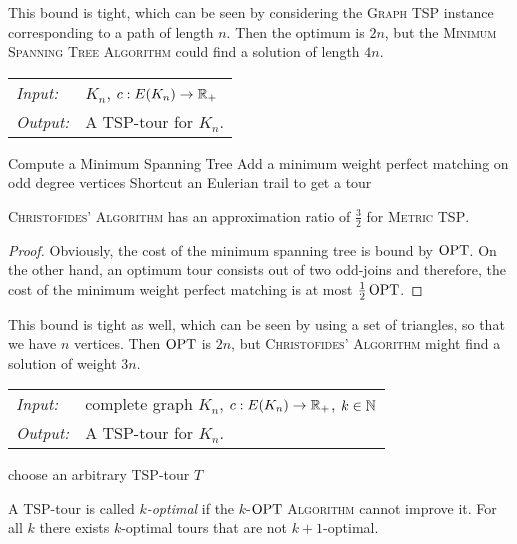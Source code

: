 \documentclass[../skript.tex]{subfiles}
\begin{document}
This bound is tight, which can be seen by considering the \textsc{Graph TSP} instance corresponding to a path of length $n$. Then the optimum is $2n$, but the \textsc{Minimum Spanning Tree Algorithm} could find a solution of length $4n$.
\begin{samepage}
\begin{algorithmbox}
\begin{tabular}{@{}ll}
\textit{Input:} & $K_n$, $c : E(K_n) \to \mathbb{R}_+$\\
\textit{Output:} & A TSP-tour for $K_n$.
\end{tabular}
\end{algorithmbox}
\vspace{-7pt}
\begin{algorithm}[H]
Compute a Minimum Spanning Tree\;
Add a minimum weight perfect matching on odd degree vertices\;
Shortcut an Eulerian trail to get a tour\;
\end{algorithm}
\vspace{-7pt}
\EndAlgorithmLine
\end{samepage}
\begin{theorem} %
\label{thm:88}
\textsc{Christofides' Algorithm} has an approximation ratio of $\frac{3}{2}$ for \textsc{Metric TSP}.
\end{theorem}
\begin{proof}
Obviously, the cost of the minimum spanning tree is bound by $\operatorname{OPT}$. On the other hand, an optimum tour consists out of two odd-joins and therefore, the cost of the minimum weight perfect matching is at most $\frac{1}{2} \operatorname{OPT}$.
\end{proof}
This bound is tight as well, which can be seen by using a set of triangles, so that we have $n$ vertices. Then $\operatorname{OPT}$ is $2n$, but \textsc{Christofides' Algorithm} might find a solution of weight $3n$.
\begin{samepage}
\begin{algorithmbox}
\begin{tabular}{@{}ll}
\textit{Input:} & complete graph $K_n$, $c : E(K_n) \to \mathbb{R}_+$, $k \in \mathbb{N}$\\
\textit{Output:} & A TSP-tour for $K_n$.
\end{tabular}
\end{algorithmbox}
\vspace{-7pt}
\begin{algorithm}[H]
choose an arbitrary TSP-tour $T$\;
\;
\end{algorithm}
\vspace{-7pt}
\EndAlgorithmLine
\end{samepage}
A TSP-tour is called \emph{$k$-optimal} if the \textsc{$k$-$\operatorname{OPT}$ Algorithm} cannot improve it.
For all $k$ there exists $k$-optimal tours that are not $k+1$-optimal.
\end{document}
